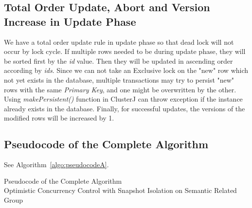 \documentclass[runningheads,a4paper]{llncs}
\begin{document}
\subsection{Total Order Update, Abort and Version Increase in Update Phase}
We have a total order update rule in update phase so that dead lock will not occur by lock cycle. If multiple rows needed to be during update phase, they will be sorted first by the \textit{id} value. Then they will be updated in ascending order according by \textit{ids}. Since we can not take an Exclusive lock on the "new" row which not yet exists in the database, multiple transactions may try to persist "new" rows with the same \textit{Primary Key}, and one might be overwritten by the other. Using \textit{makePersistent()} function in ClusterJ can throw exception if the instance already exists in the database. Finally, for successful updates, the versions of the modified rows will be increased by 1.
\subsection{Pseudocode of the Complete Algorithm}
See Algorithm~\ref{algo:pseudocodeA}.
\begin{algorithm}[!h]
	\caption{Pseudocode of the Complete Algorithm \\ Optimistic Concurrency Control with Snapshot Isolation on Semantic Related Group}
	\label{algo:pseudocodeA}
	\begin{algorithmic}[1]
		
		\ELSE
		\ENDIF
		\ELSE 
		\ENDIF
		\ENDWHILE
		
	\end{algorithmic}
\end{algorithm}
\end{document}
